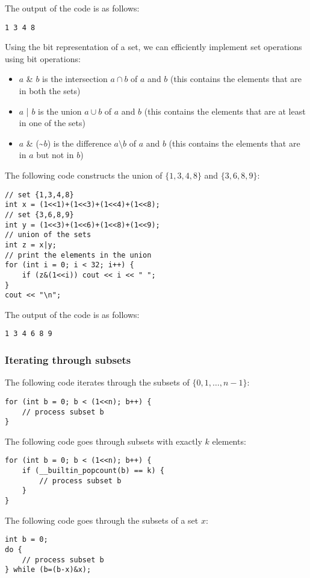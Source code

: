The output of the code is as follows:
\begin{lstlisting}
1 3 4 8
\end{lstlisting}

Using the bit representation of a set,
we can efficiently implement set operations
using bit operations:
\begin{itemize}
\item $a$ \& $b$ is the intersection $a \cap b$ of $a$ and $b$
(this contains the elements that are in both the sets)
\item $a$ | $b$ is the union $a \cup b$ of $a$ and $b$
(this contains the elements that are at least
in one of the sets)
\item $a$ \& (\textasciitilde$b$) is the difference
$a \setminus b$ of $a$ and $b$
(this contains the elements that are in $a$
but not in $b$)
\end{itemize}

The following code constructs the union
of $\{1,3,4,8\}$ and $\{3,6,8,9\}$:

\begin{lstlisting}
// set {1,3,4,8}
int x = (1<<1)+(1<<3)+(1<<4)+(1<<8);
// set {3,6,8,9}
int y = (1<<3)+(1<<6)+(1<<8)+(1<<9);
// union of the sets
int z = x|y;
// print the elements in the union
for (int i = 0; i < 32; i++) {
    if (z&(1<<i)) cout << i << " ";
}
cout << "\n";
\end{lstlisting}

The output of the code is as follows:
\begin{lstlisting}
1 3 4 6 8 9
\end{lstlisting}

\subsubsection{Iterating through subsets}

The following code iterates through
the subsets of $\{0,1,\ldots,n-1\}$:

\begin{lstlisting}
for (int b = 0; b < (1<<n); b++) {
    // process subset b
}
\end{lstlisting}
The following code goes through
subsets with exactly $k$ elements:
\begin{lstlisting}
for (int b = 0; b < (1<<n); b++) {
    if (__builtin_popcount(b) == k) {
        // process subset b
    }
}
\end{lstlisting}
The following code goes through the subsets
of a set $x$:
\begin{lstlisting}
int b = 0;
do {
    // process subset b
} while (b=(b-x)&x);
\end{lstlisting}

